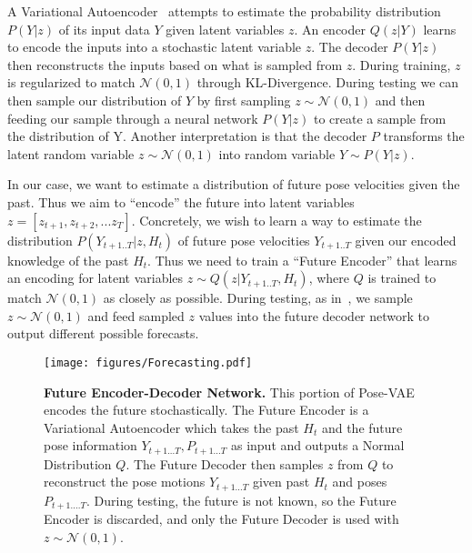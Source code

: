  A Variational Autoencoder~\cite{Kingma14a} attempts to estimate the probability distribution $P(Y|z)$ of its input data $Y$ given latent variables $z$. An encoder $Q(z|Y)$  learns to encode the inputs into a stochastic latent variable $z$. The decoder $P(Y|z)$ then reconstructs the inputs based on what is sampled from $z$. During training, $z$ is regularized to match $\mathcal{N}(0,1)$ through KL-Divergence. During testing we can then sample our distribution of $Y$ by first sampling $z \sim \mathcal{N}(0,1)$ and then feeding our sample through a neural network $P(Y|z)$ to create a sample from the distribution of Y. Another interpretation is that the decoder $P$ transforms the latent random variable $z \sim \mathcal{N}(0,1)$ into random variable $Y \sim P(Y|z)$.

In our case, we want to estimate a distribution of future pose velocities given the past. Thus we aim to ``encode'' the future into latent variables $z = [z_{t+1}, z_{t+2}, ... z_T]$. Concretely, we wish to learn a way to estimate the distribution $P(Y_{t+1..T}|z,H_{t})$ of future pose velocities $Y_{t+1..T}$ given our encoded knowledge of the past $H_{t}$. Thus we need to train a ``Future Encoder'' that learns an encoding for latent variables $z \sim Q(z|Y_{t+1..T},H_{t})$, where $Q$ is trained to match $\mathcal{N}(0,1)$ as closely as possible. 
During testing, as in~\cite{Walker16}, we sample $z \sim \mathcal{N}(0,1)$ and feed sampled $z$ values into the future decoder network to output different possible forecasts.

\begin{figure}
\centering
\texttt{[image: figures/Forecasting.pdf]} 
\caption{{\bf Future Encoder-Decoder Network.} This portion of Pose-VAE encodes the future stochastically. The Future Encoder is a Variational Autoencoder which takes the past $H_{t}$ and the future pose information $Y_{t+1...T}, P_{t+1...T}$ as input and outputs a Normal Distribution $Q$. The Future Decoder then samples $z$ from $Q$ to reconstruct the pose motions $Y_{t+1...T}$ given past $H_{t}$ and poses $P_{t+1....T}$. During testing, the future is not known, so the Future Encoder is discarded, and only the Future Decoder is used with $z \sim \mathcal{N}(0,1)$. }
\label{fig:SequentialFuture}
\end{figure}

